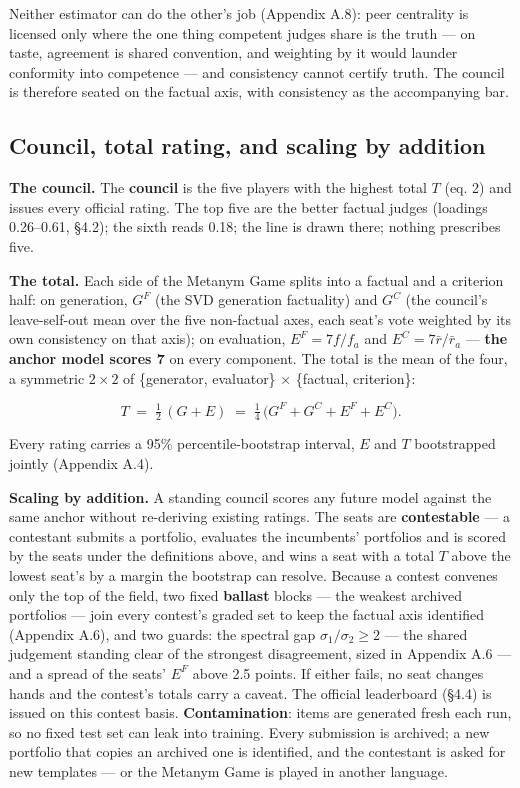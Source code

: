 \documentclass{article}
\begin{document}
Neither estimator can do the other's job (Appendix A.8): peer centrality is licensed only where the one thing competent judges share is the truth --- on taste, agreement is shared convention, and weighting by it would launder conformity into competence --- and consistency cannot certify truth. The council is therefore seated on the factual axis, with consistency as the accompanying bar.

\subsection{Council, total rating, and scaling by addition}\label{council-total-rating-and-scaling-by-addition}

\textbf{The council.} The \textbf{council} is the five players with the highest total \(T\) (eq. 2) and issues every official rating. The top five are the better factual judges (loadings 0.26--0.61, \S{}4.2); the sixth reads 0.18; the line is drawn there; nothing prescribes five.

\textbf{The total.} Each side of the Metanym Game splits into a factual and a criterion half: on generation, \(G^{F}\) (the SVD generation factuality) and \(G^{C}\) (the council's leave-self-out mean over the five non-factual axes, each seat's vote weighted by its own consistency on that axis); on evaluation, \(E^{F} = 7f/f_a\) and \(E^{C} = 7\bar r/\bar r_a\) --- \textbf{the anchor model scores 7} on every component. The total is the mean of the four, a symmetric \(2\times2\) of \{generator, evaluator\} \ensuremath{\times} \{factual, criterion\}:

\[T \;=\; \tfrac12\,(G+E) \;=\; \tfrac14\,\big(G^{F}+G^{C}+E^{F}+E^{C}\big). \tag{2}\]

Every rating carries a 95\% percentile-bootstrap interval, \(E\) and \(T\) bootstrapped jointly (Appendix A.4).

\textbf{Scaling by addition.} A standing council scores any future model against the same anchor without re-deriving existing ratings. The seats are \textbf{contestable} --- a contestant submits a portfolio, evaluates the incumbents' portfolios and is scored by the seats under the definitions above, and wins a seat with a total \(T\) above the lowest seat's by a margin the bootstrap can resolve. Because a contest convenes only the top of the field, two fixed \textbf{ballast} blocks --- the weakest archived portfolios --- join every contest's graded set to keep the factual axis identified (Appendix A.6), and two guards: the spectral gap \(\sigma_1/\sigma_2 \ge 2\) --- the shared judgement standing clear of the strongest disagreement, sized in Appendix A.6 --- and a spread of the seats' \(E^{F}\) above 2.5 points. If either fails, no seat changes hands and the contest's totals carry a caveat. The official leaderboard (\S{}4.4) is issued on this contest basis. \textbf{Contamination}: items are generated fresh each run, so no fixed test set can leak into training. Every submission is archived; a new portfolio that copies an archived one is identified, and the contestant is asked for new templates --- or the Metanym Game is played in another language.
\end{document}

